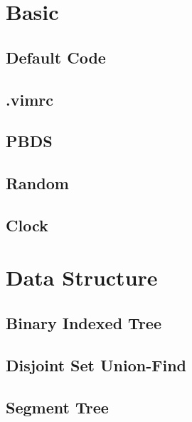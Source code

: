 \documentclass[twocolumn]{article}
\begin{document}
\setlength\parindent{0pt}

\tableofcontents

\pagestyle{fancy}
\fancyfoot{}
\fancyhead[R]{\thepage}

\section{Basic}

\subsection{Default Code}


\subsection{.vimrc}


\subsection{PBDS}


\subsection{Random}


\subsection{Clock}


\section{Data Structure}

\subsection{Binary Indexed Tree}


\subsection{Disjoint Set Union-Find}


\subsection{Segment Tree}

\end{document}
